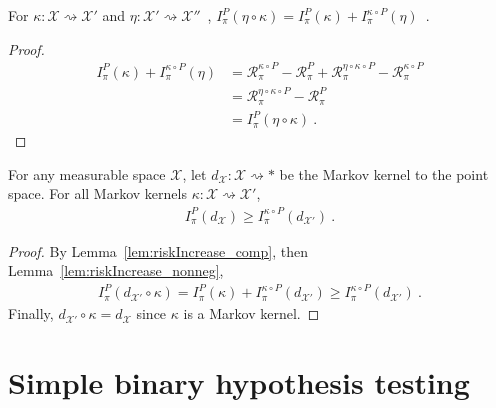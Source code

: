 \begin{lemma}
  \label{lem:riskIncrease_comp}
  For $\kappa : \mathcal X \rightsquigarrow \mathcal X'$ and $\eta : \mathcal X' \rightsquigarrow \mathcal X''$~,
  $I^P_\pi(\eta \circ \kappa) = I^P_\pi(\kappa) + I^{\kappa \circ P}_\pi(\eta)$~.
\end{lemma}

\begin{proof}%
\uses{}
\begin{align*}
I^P_\pi(\kappa) + I^{\kappa \circ P}_\pi(\eta)
&= \mathcal R^{\kappa \circ P}_\pi - \mathcal R^{P}_\pi + \mathcal R^{\eta \circ \kappa \circ P}_\pi - \mathcal R^{\kappa \circ P}_\pi
\\
&= \mathcal R^{\eta \circ \kappa \circ P}_\pi - \mathcal R^{P}_\pi
\\
&= I^P_\pi(\eta \circ \kappa)
\: .
\end{align*}
\end{proof}

\begin{lemma}
  \label{lem:riskIncrease_comp_del}
  For any measurable space $\mathcal X$, let $d_{\mathcal X} : \mathcal X \rightsquigarrow *$ be the Markov kernel to the point space.
  For all Markov kernels $\kappa : \mathcal X \rightsquigarrow \mathcal X'$,
  \begin{align*}
  I_\pi^P(d_{\mathcal X}) \ge I_\pi^{\kappa \circ P}(d_{\mathcal X'}) \: .
  \end{align*}
\end{lemma}

\begin{proof}%
{}
By Lemma~\ref{lem:riskIncrease_comp}, then Lemma~\ref{lem:riskIncrease_nonneg},
\begin{align*}
I_\pi^P(d_{\mathcal X'} \circ \kappa)
= I^P_\pi(\kappa) + I^{\kappa \circ P}_\pi(d_{\mathcal X'})
\ge I_\pi^{\kappa \circ P}(d_{\mathcal X'})
\: .
\end{align*}
Finally, $d_{\mathcal X'} \circ \kappa = d_{\mathcal X}$ since $\kappa$ is a Markov kernel.
\end{proof}

\section{Simple binary hypothesis testing}

